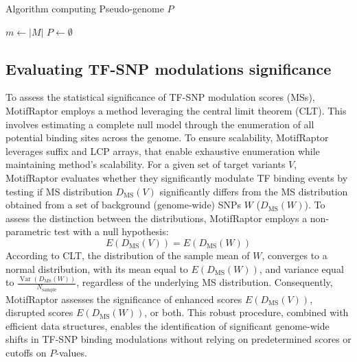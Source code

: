\documentclass[a4paper, titlepage, openright]{book}
\DeclareMathOperator*{\Var}{Var}
\newcommand{\motifraptor}{MotifRaptor\xspace}
\begin{document}
\begin{algorithm}[!]
    \caption{Algorithm computing Pseudo-genome $P$}
    \label{alg:motifraptor-pseudogenome}
    $m \gets |M|$\;
    $P \gets \emptyset$\;
\end{algorithm}

\subsection{Evaluating TF-SNP modulations significance}
To assess the statistical significance of TF-SNP modulation scores (MSs), \motifraptor employs a method leveraging the central limit theorem (CLT). This involves estimating a complete null model through the enumeration of all potential binding sites across the genome. To ensure scalability, \motifraptor leverages suffix and LCP arrays, that enable exhaustive enumeration while maintaining method's scalability. For a given set of target variants $V$, \motifraptor evaluates whether they significantly modulate TF binding events by testing if MS distribution $D_{\text{MS}}(V)$ significantly differs from the MS distribution obtained from a set of background (genome-wide) SNPs $W$ ($D_{\text{MS}}(W)$). To assess the distinction between the distributions, \motifraptor employs a non-parametric test with a null hypothesis: 
\[
    E(D_{\text{MS}}(V))=E(D_{\text{MS}}(W))
\]
According to CLT, the distribution of the sample mean of $W$, converges to a normal distribution, with its mean equal to $E(D_{\text{MS}}(W))$, and variance equal to $\frac{\Var({D_{\text{MS}}(W)})}{N_{\text{sample}}}$, regardless of the underlying MS distribution. Consequently, \motifraptor assesses the significance of enhanced scores $E(D_{\text{MS}}(V))$, disrupted scores $E(D_{\text{MS}}(W))$, or both. This robust procedure, combined with efficient data structures, enables the identification of significant genome-wide shifts in TF-SNP binding modulations without relying on predetermined scores or cutoffs on $P$-values.

\end{document}
